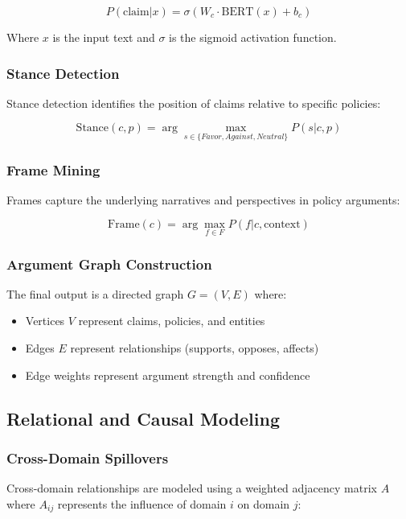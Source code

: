 \begin{equation}
P(\text{claim}|x) = \sigma(W_c \cdot \text{BERT}(x) + b_c)
\end{equation}

Where $x$ is the input text and $\sigma$ is the sigmoid activation function.

\subsubsection{Stance Detection}
Stance detection identifies the position of claims relative to specific policies:

\begin{equation}
\text{Stance}(c, p) = \arg\max_{s \in \{Favor, Against, Neutral\}} P(s|c, p)
\end{equation}

\subsubsection{Frame Mining}
Frames capture the underlying narratives and perspectives in policy arguments:

\begin{equation}
\text{Frame}(c) = \arg\max_{f \in F} P(f|c, \text{context})
\end{equation}

\subsubsection{Argument Graph Construction}
The final output is a directed graph $G = (V, E)$ where:
\begin{itemize}
    \item Vertices $V$ represent claims, policies, and entities
    \item Edges $E$ represent relationships (supports, opposes, affects)
    \item Edge weights represent argument strength and confidence
\end{itemize}

\subsection{Relational and Causal Modeling}

\subsubsection{Cross-Domain Spillovers}
Cross-domain relationships are modeled using a weighted adjacency matrix $A$ where $A_{ij}$ represents the influence of domain $i$ on domain $j$:

